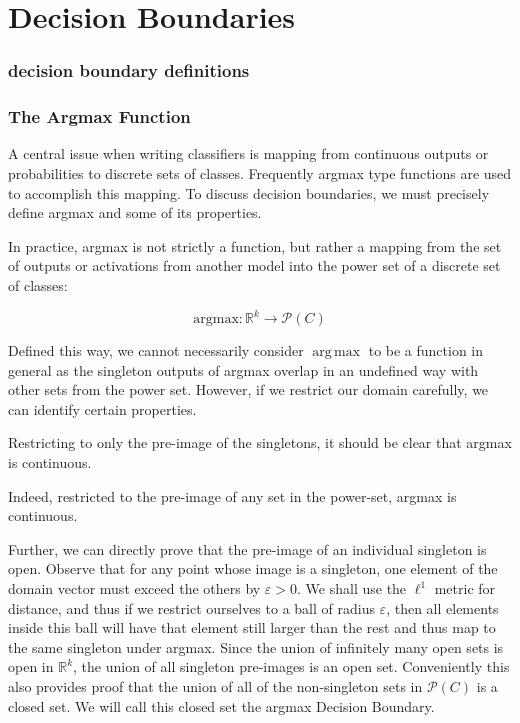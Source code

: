 \documentclass[10pt]{extarticle}
\DeclareMathOperator*{\argmax}{arg\,max}
\newcommand{\R}{\mathbb{R}}
\begin{document}


\part{Decision Boundaries}
\section{decision boundary definitions} 
\section{The Argmax Function}

A central issue when writing classifiers is mapping from continuous outputs or probabilities to discrete sets of classes. Frequently argmax type functions are used to accomplish this mapping. To discuss decision boundaries, we must precisely define argmax and some of its properties. 

In practice, argmax is not strictly a function, but rather a mapping from the set of outputs or activations from another model into the power set of a discrete set of classes:

\begin{equation}
    \text{argmax} : \R^k \to \mathcal{P}(C)
\end{equation}

Defined this way, we cannot necessarily consider $\argmax$ to be a function in general as the singleton outputs of argmax overlap in an undefined way with other sets from the power set. However, if we restrict our domain carefully, we can identify certain properties. 

Restricting to only the pre-image of the singletons, it should be clear that argmax is continuous. 

Indeed, restricted to the pre-image of any set in the power-set, argmax is continuous. 

Further, we can directly prove that the pre-image of an individual singleton is open. Observe that for any point whose image is a singleton, one element of the domain vector must exceed the others by $\varepsilon > 0$. We shall use the $\ell^1$ metric for distance, and thus if we restrict ourselves to a ball of radius $\varepsilon$, then all elements inside this ball will have that element still larger than the rest and thus map to the same singleton under argmax. Since the union of infinitely many open sets is open in $\R^k$, the union of all singleton pre-images is an open set. Conveniently this also provides proof that the union of all of the non-singleton sets in $\mathcal{P}(C)$ is a closed set. We will call this closed set the argmax Decision Boundary. 
\end{document}
